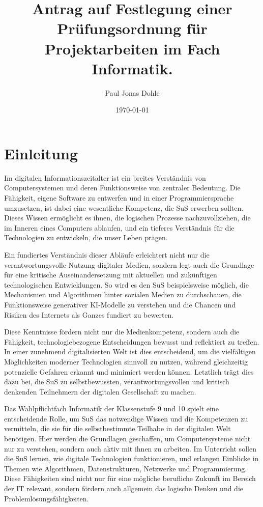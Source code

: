 \documentclass[a4paper,12pt]{article}
\title{Antrag auf Festlegung einer Prüfungsordnung für Projektarbeiten im Fach Informatik.}
\author{Paul Jonas Dohle}
\date{\today}
\begin{document}
\maketitle
\newpage

\tableofcontents
\newpage

\section{Einleitung}
Im digitalen Informationszeitalter ist ein breites Verständnis von Computersystemen und deren Funktionsweise von zentraler Bedeutung. Die Fähigkeit, eigene Software zu entwerfen und in einer Programmiersprache umzusetzen, ist dabei eine wesentliche Kompetenz, die SuS erwerben sollten. Dieses Wissen ermöglicht es ihnen, die logischen Prozesse nachzuvollziehen, die im Inneren eines Computers ablaufen, und ein tieferes Verständnis für die Technologien zu entwickeln, die unser Leben prägen.

Ein fundiertes Verständnis dieser Abläufe erleichtert nicht nur die verantwortungsvolle Nutzung digitaler Medien, sondern legt auch die Grundlage für eine kritische Auseinandersetzung mit aktuellen und zukünftigen technologischen Entwicklungen. So wird es den SuS beispielsweise möglich, die Mechanismen und Algorithmen hinter sozialen Medien zu durchschauen, die Funktionsweise generativer KI-Modelle zu verstehen und die Chancen und Risiken des Internets als Ganzes fundiert zu bewerten.

Diese Kenntnisse fördern nicht nur die Medienkompetenz, sondern auch die Fähigkeit, technologiebezogene Entscheidungen bewusst und reflektiert zu treffen. In einer zunehmend digitalisierten Welt ist dies entscheidend, um die vielfältigen Möglichkeiten moderner Technologien sinnvoll zu nutzen, während gleichzeitig potenzielle Gefahren erkannt und minimiert werden können. Letztlich trägt dies dazu bei, die SuS zu selbstbewussten, verantwortungsvollen und kritisch denkenden Teilnehmern der digitalen Gesellschaft zu machen.

Das Wahlpflichtfach Informatik der Klassenstufe 9 und 10 spielt eine entscheidende Rolle, um SuS das notwendige Wissen und die Kompetenzen zu vermitteln, die sie für die selbstbestimmte Teilhabe in der digitalen Welt benötigen. Hier werden die Grundlagen geschaffen, um Computersysteme nicht nur zu verstehen, sondern auch aktiv mit ihnen zu arbeiten. Im Unterricht sollen die SuS lernen, wie digitale Technologien funktionieren, und erlangen Einblicke in Themen wie Algorithmen, Datenstrukturen, Netzwerke und Programmierung. Diese Fähigkeiten sind nicht nur für eine mögliche berufliche Zukunft im Bereich der IT relevant, sondern fördern auch allgemein das logische Denken und die Problemlösungsfähigkeiten.
\end{document}
